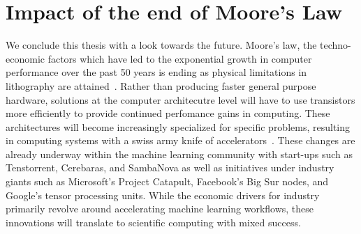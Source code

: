 \section{Impact of the end of Moore's Law}

We conclude this thesis with a look towards the future. Moore's law, the techno-economic factors which have led to the exponential growth in computer performance over the past 50 years is ending as physical limitations in lithography are attained~\cite{Shalf2020}. Rather than producing faster general purpose hardware, solutions at the computer architecutre level will have to use transistors more efficiently to provide continued perfomance gains in computing. These architectures will become increasingly specialized for specific problems, resulting in computing systems with a swiss army knife of accelerators~\cite{EH2018}. These changes are already underway within the machine learning community with start-ups such as Tenstorrent, Cerebaras, and SambaNova as well as initiatives under industry giants such as Microsoft's Project Catapult, Facebook's Big Sur nodes, and Google's tensor processing units. While the economic drivers for industry primarily revolve around accelerating machine learning workflows, these innovations will translate to scientific computing with mixed success.

